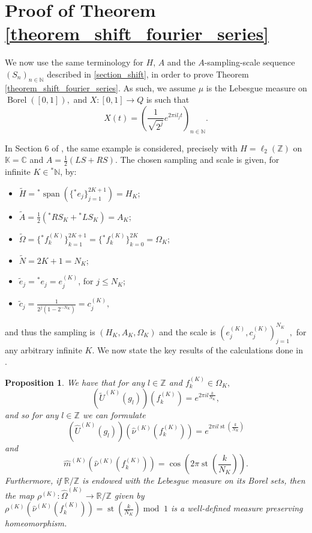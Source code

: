 \documentclass{amsart}
\newtheorem{prop}[thm]{Proposition}
\theoremstyle{definition}
\theoremstyle{remark}
\def \Span{\operatorname{span}}
\def \St{\operatorname{st}}
\def \Borel{\operatorname{Borel}}
\def \HOM{\hat{\Omega}}
\def \HNU{\hat{\nu}}
\def \HU{\hat{U}}
\def \Hm{\hat{m}}
\begin{document}
\section{Proof of Theorem \ref{theorem_shift_fourier_series} }\label{appendix_shift}

We now use the same terminology for $H$, $A$ and the $A$-sampling-scale sequence $(S_n)_{n\in\mathbb{N}}$ described in \ref{section_shift}, in order to prove Theorem \ref{theorem_shift_fourier_series}. As such, we assume $\mu$ is the Lebesgue measure on $\Borel([0,1]),$ and $X:[0,1]\rightarrow Q$ is such that $$X(t)=\left(\frac{1}{\sqrt{2^j}}e^{2\pi i l_j t}\right)_{n\in\mathbb{N}}.$$

In Section 6 of \cite{nonez2024spectralequivalencesnonstandardsamplings}, the same example is considered, precisely with $H=\ell_2(\mathbb{Z})$ on $\mathbb{K}=\mathbb{C}$ and $A=\frac{1}{2}(LS+RS)$. The chosen sampling and scale is given, for infinite $K\in{}^*\mathbb{N}$, by:
\begin{itemize}
	\item $\tilde{H}={}^*\Span(\{{}^*e_j \}_{j=1}^{2K+1})=H_K$;
	\item $\tilde{A}=\frac{1}{2}({}^*RS_K+{}^*LS_K)=A_K$;
	\item $\tilde{\Omega}=\{{}^*f_k^{(K)} \}_{k=1}^{2K+1}=\{{}^*f_k^{(K)} \}_{k=0}^{2K}=\Omega_K$;
	\item $\tilde{N}=2K+1=N_K$;
	\item $\tilde{e}_j= {}^*e_j= e_j^{(K)}$, for $j\leq N_K$;
	\item $\tilde{c}_j=\frac{1}{2^j(1-2^{-N_K})}=c_j^{(K)},$
\end{itemize}
and thus the sampling is $(H_K,A_K,\Omega_K)$ and the scale is $(e_j^{(K)},c_j^{(K)})_{j=1}^{N_K},$ for any arbitrary infinite $K$. We now state the key results of the calculations done in \cite{nonez2024spectralequivalencesnonstandardsamplings}.

\begin{prop}
	We have that for any $l\in\mathbb{Z}$ and $f_k^{(K)}\in \Omega_K,$ $$(\tilde{U}^{(K)}(g_l))(f_k^{(K)})=e^{2\pi i l\frac{k}{N_K}},$$ and so for any $l\in\mathbb{Z}$ we can formulate $$(\HU^{(K)}(g_l))(\HNU^{(K)}(f_k^{(K)}))=e^{2\pi i l \St(\frac{k}{N_K})}$$ and $$\Hm^{(K)}(\HNU^{(K)}(f_k^{(K)}))=\cos(2\pi\St(\frac{k}{N_K})).$$
	Furthermore, if $\mathbb{R}/\mathbb{Z}$ is endowed with the Lebesgue measure on its Borel sets, then the map $\rho^{(K)}:\HOM^{(K)}\rightarrow \mathbb{R}/\mathbb{Z}$ given by $\rho^{(K)}(\HNU^{(K)}(f_k^{(K)}))=\St(\frac{k}{N_K}) \operatorname{mod}\;1$ is a well-defined measure preserving homeomorphism.
\end{prop}
\end{document}
